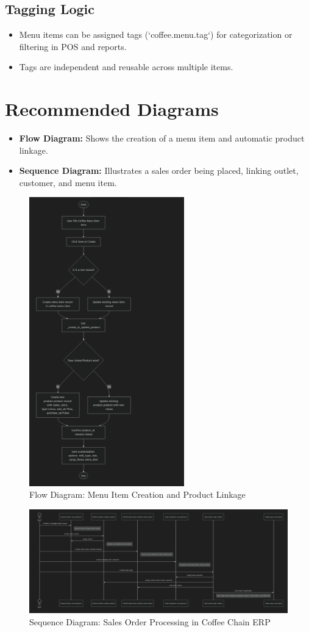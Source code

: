 \subsection*{Tagging Logic}
\begin{itemize}
    \item Menu items can be assigned tags (`coffee.menu.tag`) for categorization or filtering in POS and reports.
    \item Tags are independent and reusable across multiple items.
\end{itemize}

\section*{Recommended Diagrams}
\begin{itemize}
    \item \textbf{Flow Diagram:} Shows the creation of a menu item and automatic product linkage.
    \item \textbf{Sequence Diagram:} Illustrates a sales order being placed, linking outlet, customer, and menu item.
\end{itemize}

\begin{figure}[H]
\centering
\includegraphics[width=0.6\textwidth,keepaspectratio]{diagrams/flowdiagram.png}
\caption{Flow Diagram: Menu Item Creation and Product Linkage}
\end{figure}

\begin{figure}[H]
\centering
\includegraphics[width=1.0\textwidth,keepaspectratio]{diagrams/sequence.png}
\caption{Sequence Diagram: Sales Order Processing in Coffee Chain ERP}
\end{figure}
